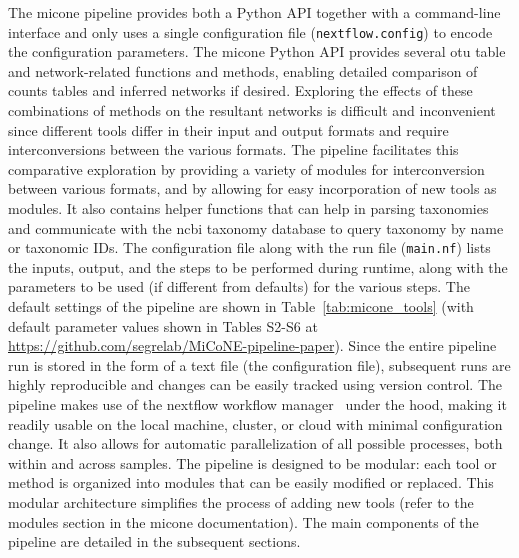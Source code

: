   The \ac{micone} pipeline provides both a Python API together with a command-line interface and only uses a single configuration file (\texttt{nextflow.config}) to encode the configuration parameters.
  The \ac{micone} Python API provides several \ac{otu} table and network-related functions and methods, enabling detailed comparison of counts tables and inferred networks if desired.
  Exploring the effects of these combinations of methods on the resultant networks is difficult and inconvenient since different tools differ in their input and output formats and require interconversions between the various formats.
  The pipeline facilitates this comparative exploration by providing a variety of modules for interconversion between various formats, and by allowing for easy incorporation of new tools as modules.
  It also contains helper functions that can help in parsing taxonomies and communicate with the \ac{ncbi} taxonomy database to query taxonomy by name or taxonomic IDs.
  The configuration file along with the run file (\texttt{main.nf}) lists the inputs, output, and the steps to be performed during runtime, along with the parameters to be used (if different from defaults) for the various steps.
  The default settings of the pipeline are shown in Table~\ref{tab:micone_tools} (with default parameter values shown in Tables S2-S6 at \href{https://github.com/segrelab/MiCoNE-pipeline-paper}{https://github.com/segrelab/MiCoNE-pipeline-paper}).
  Since the entire pipeline run is stored in the form of a text file (the configuration file), subsequent runs are highly reproducible and changes can be easily tracked using version control.
  The pipeline makes use of the nextflow workflow manager~\cite{Tommaso2015} under the hood, making it readily usable on the local machine, cluster, or cloud with minimal configuration change.
  It also allows for automatic parallelization of all possible processes, both within and across samples.
  The pipeline is designed to be modular: each tool or method is organized into modules that can be easily modified or replaced.
  This modular architecture simplifies the process of adding new tools (refer to the modules section in the \ac{micone} documentation).
  The main components of the pipeline are detailed in the subsequent sections.

